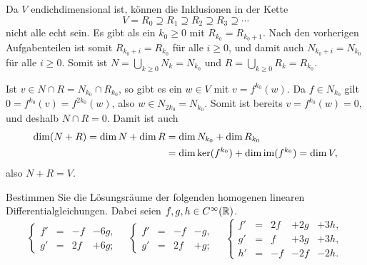 \documentclass[a4paper, 10pt]{scrartcl}
\begin{document}
\begin{solution}
\begin{enumerate}[leftmargin=*]
      Da $V$ endichdimensional ist, können die Inklusionen in der Kette
      \[
        V = R_0 \supseteq R_1 \supseteq R_2 \supseteq R_3 \supseteq \dotsb
      \]
      nicht alle echt sein.
      Es gibt als ein $k_0 \geq 0$ mit $R_{k_0} = R_{k_0 + 1}$.
      Nach den vorherigen Aufgabenteilen ist somit $R_{k_0 + i} = R_{k_0}$ für alle $i \geq 0$, und damit auch $N_{k_0 + i} = N_{k_0}$ für alle $i \geq 0$.
      Somit ist $N = \bigcup_{k \geq 0} N_k = N_{k_0}$ und $R = \bigcup_{k \geq 0} R_k = R_{k_0}$.
      
      Ist $v \in N \cap R = N_{k_0} \cap R_{k_0}$, so gibt es ein $w \in V$ mit $v = f^{k_0}(w)$.
      Da $f \in N_{k_0}$ gilt $0 = f^{k_0}(v) = f^{2 k_0}(w)$, also $w \in N_{2 k_0} = N_{k_0}$.
      Somit ist bereits $v = f^{k_0}(w) = 0$, und deshalb $N \cap R = 0$.
      Damit ist auch
      \begin{align*}
            \dim(N + R)
         =  \dim N + \dim R
        &=  \dim N_{k_0} + \dim R_{k_0}
        \\
        &=  \dim \ker(f^{k_0}) + \dim \operatorname{im}(f^{k_0})
         =  \dim V,
      \end{align*}
      also $N + R = V$.
  \end{enumerate}
\end{solution}



\begin{question}
  Bestimmen Sie die Lösungsräume der folgenden homogenen linearen Differentialgleichungen.
  Dabei seien $f, g, h \in C^\infty(\mathbb{R})$.
  \[
    \left\{
      \begin{array}{ccrr}
        f'  & = & -f  & - 6g, \\
        g'  & = & 2f  & + 6g;
      \end{array}
    \right.
    \quad
    \left\{
      \begin{array}{ccrr}
        f'  & = & -f  & - g,  \\
        g'  & = & 2f  & + g;
      \end{array}
    \right.
    \quad
    \left\{
      \begin{array}{ccrrr}
        f'  & = & 2f  & + 2g  & + 3h, \\
        g'  & = &  f  & + 3g  & + 3h, \\
        h'  & = & -f  & - 2f  & - 2h.
      \end{array}
    \right.
  \]
\end{question}
\end{document}
